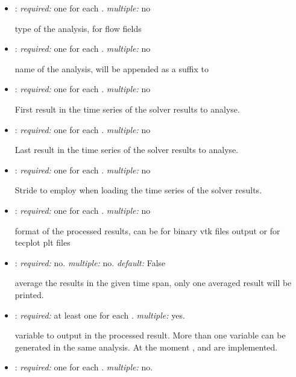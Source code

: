 \begin{itemize}
\item {}: \textit{required:} one for each . \textit{multiple:} no

type of the analysis,  for flow fields

\item {}: \textit{required:} one for each . \textit{multiple:} no

name of the analysis, will be appended as a suffix to 

\item {}: \textit{required:} one for each . \textit{multiple:} no

First result in the time series of the solver results to analyse.

\item {}: \textit{required:} one for each . \textit{multiple:} no

Last result in the time series of the solver results to analyse.

\item {}: \textit{required:} one for each . \textit{multiple:} no

Stride to employ when loading the time series of the solver results. 

\item {}: \textit{required:} one for each . \textit{multiple:} no

format of the processed results, can be  for binary vtk files output 
or  for tecplot plt files

\item {}: \textit{required:} no. \textit{multiple:} no. \textit{default:} False

average the results in the given time span, only one averaged result will be printed. 

\item {}: \textit{required:} at least one for each . 
\textit{multiple:} yes.

variable to output in the processed result. More than one variable can be generated in the same analysis. 
At the moment ,  and  are implemented.

\item {}: \textit{required:} one for each . \textit{multiple:} no.


\end{itemize}
